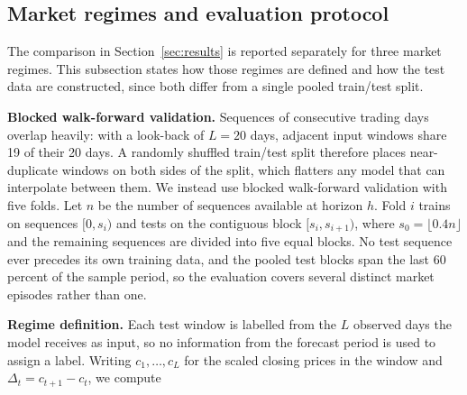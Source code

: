 

\subsection{Market regimes and evaluation protocol}
\label{sec:regimes}

The comparison in Section~\ref{sec:results} is reported separately for three
market regimes. This subsection states how those regimes are defined and how the
test data are constructed, since both differ from a single pooled train/test
split.

\noindent\textbf{Blocked walk-forward validation.}
Sequences of consecutive trading days overlap heavily: with a look-back of
$L = 20$ days, adjacent input windows share 19 of their 20 days. A randomly
shuffled train/test split therefore places near-duplicate windows on both sides
of the split, which flatters any model that can interpolate between them. We
instead use blocked walk-forward validation with five folds. Let $n$ be the
number of sequences available at horizon $h$. Fold $i$ trains on sequences
$[0, s_i)$ and tests on the contiguous block $[s_i, s_{i+1})$, where
$s_0 = \lfloor 0.4 n \rfloor$ and the remaining sequences are divided into five
equal blocks. No test sequence ever precedes its own training data, and the
pooled test blocks span the last 60 percent of the sample period, so the
evaluation covers several distinct market episodes rather than one.

\noindent\textbf{Regime definition.}
Each test window is labelled from the $L$ observed days the model receives as
input, so no information from the forecast period is used to assign a label.
Writing $c_1, \dots, c_L$ for the scaled closing prices in the window and
$\Delta_t = c_{t+1} - c_t$, we compute

